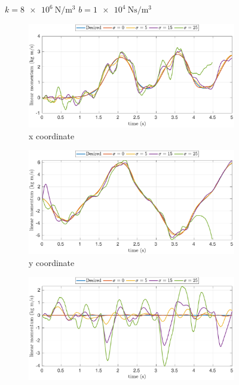 \begin{figure}[t]
    \begin{myframe}{$k = \SI{8e6}{\newton \per \meter^3}$ $b = \SI{1e4}{\newton \second \per \meter^3}$}
        \centering
        \begin{subfigure}[b]{0.49\textwidth}
        \centering
        \includegraphics[height=0.151\textheight]{chapter_compliant_contact/figures/noise_linear_momentum_x.pdf}
        \caption{x coordinate}
        \label{fig:noise_linear_momentum_x}
    \end{subfigure}
    \hfill
    \begin{subfigure}[b]{0.49\textwidth}
        \centering
        \includegraphics[height=0.151\textheight]{chapter_compliant_contact/figures/noise_linear_momentum_y.pdf}
        \caption{y coordinate}
        \label{fig:noise_linear_momentum_y}
    \end{subfigure}
    \hfill
     \begin{subfigure}[b]{0.49\textwidth}
        \centering
        \includegraphics[height=0.151\textheight]{chapter_compliant_contact/figures/noise_linear_momentum_z.pdf}

\end{subfigure}
\end{myframe}
\end{figure}

